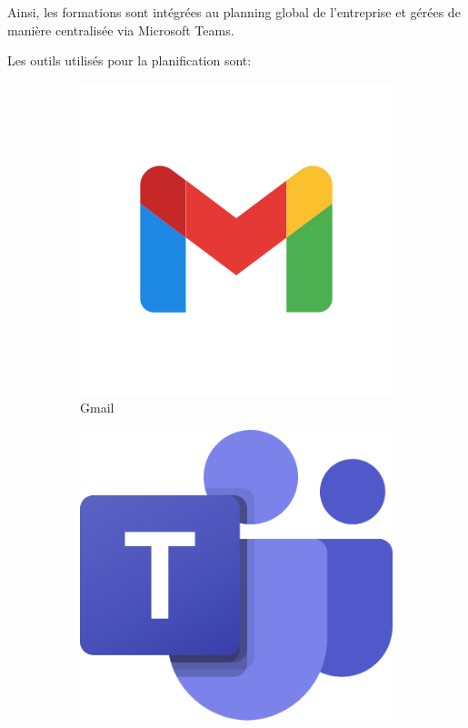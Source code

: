 \documentclass{article}
\begin{document}
\vspace{0,3cm}

\noindent Ainsi, les formations sont intégrées au planning global de l’entreprise et gérées de manière centralisée via Microsoft Teams.
\vspace{0,3cm}

\noindent Les outils utilisés pour la planification sont: 
\begin{figure}[H]
  \centering
  \begin{subfigure}[t]{0.15\textwidth}
    \centering
    \includegraphics[width=\textwidth]{Gmail.jpg}
    \caption{Gmail}
    \label{fig:gmail}
  \end{subfigure}
  \hspace{1cm}
  \begin{subfigure}[t]{0.15\textwidth}
    \centering
    \includegraphics[width=\textwidth]{teams.png}

\end{subfigure}
\end{figure}
\end{document}
